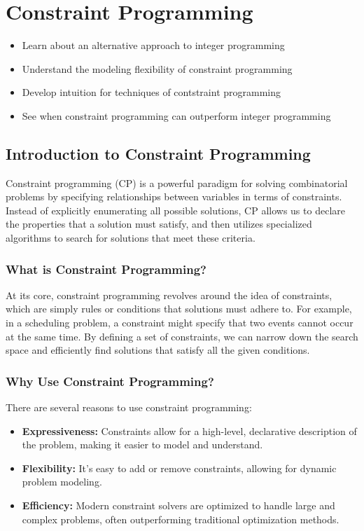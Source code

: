 \chapter{Constraint Programming}
\begin{outcome}
\begin{itemize}
\item Learn about an alternative approach to integer programming
\item Understand the modeling flexibility of constraint programming
\item Develop intuition for techniques of contstraint programming
\item See when constraint programming can outperform integer programming
\end{itemize}
\end{outcome}
\section{Introduction to Constraint Programming}

Constraint programming (CP) is a powerful paradigm for solving combinatorial problems by specifying relationships between variables in terms of constraints. Instead of explicitly enumerating all possible solutions, CP allows us to declare the properties that a solution must satisfy, and then utilizes specialized algorithms to search for solutions that meet these criteria.

\subsection{What is Constraint Programming?}

At its core, constraint programming revolves around the idea of constraints, which are simply rules or conditions that solutions must adhere to. For example, in a scheduling problem, a constraint might specify that two events cannot occur at the same time. By defining a set of constraints, we can narrow down the search space and efficiently find solutions that satisfy all the given conditions.

\subsection{Why Use Constraint Programming?}

There are several reasons to use constraint programming:

\begin{itemize}
    \item \textbf{Expressiveness:} Constraints allow for a high-level, declarative description of the problem, making it easier to model and understand.
    \item \textbf{Flexibility:} It's easy to add or remove constraints, allowing for dynamic problem modeling.
    \item \textbf{Efficiency:} Modern constraint solvers are optimized to handle large and complex problems, often outperforming traditional optimization methods.
\end{itemize}


